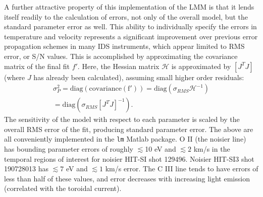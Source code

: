 	\hspace*{4ex}A further attractive property of this implementation of the LMM is that it lends itself readily to the calculation of errors, not only of the overall model, but the standard parameter error as well. This ability to individually specify the errors in temperature and velocity represents a significant improvement over previous error propagation schemes in many IDS instruments, which appear limited to RMS error, or S/N values. This is accomplished by approximating the covariance matrix of the final fit $f'$. Here, the Hessian matrix $\mathcal{H}$ is approximated by $[J^TJ]$ (where $J$ has already been calculated), assuming small higher order residuals\cite{yuen2010bayesian}:
	\begin{eqnarray}
	\sigma_P^2 =\mathrm{diag(covariance(f'))}= \mathrm{diag}(\sigma_{RMS}\mathcal{H}^{-1})\nonumber\\ = \mathrm{diag}(\sigma_{RMS}[J^TJ]^{-1}).
	\end{eqnarray}
	The sensitivity of the model with respect to each parameter is scaled by the overall RMS error of the fit, producing standard parameter error. The above are all conveniently implemented in the \texttt{lm} Matlab package. O II (the noisier line) has bounding parameter errors of roughly $\lesssim$10 eV and $\lesssim2$ km/s in the temporal regions of interest for noisier HIT-SI shot 129496. Noisier HIT-SI3 shot 190728013 has $\lesssim7$ eV and $\lesssim1$ km/s error. The C III line tends to have errors of less than half of these values, and error decreases with increasing light emission (correlated with the toroidal current).
	
	
	
	
